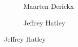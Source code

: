 \begin{frame}[plain]
\begin{figure}[h]
\begin{subfigure}{0.30\textwidth}
	\caption{\scriptsize Maarten Derickx}
	\end{subfigure}
	\begin{subfigure}{0.30\textwidth}
	\captionsetup{labelformat=empty}
	\centering
	\caption{\scriptsize Jeffrey Hatley}
	\end{subfigure}
	\end{figure}
\end{frame}



